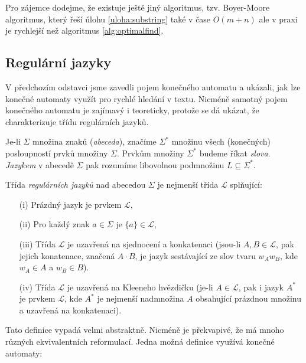 
Pro zájemce dodejme, že existuje ještě jiný algoritmus, tzv. Boyer-Moore algoritmus, 
který řeší úlohu \ref{uloha:substring} také v čase \(O(m+n)\) ale v praxi je rychlejší než 
algoritmus \ref{alg:optimalfind}.

\subsection*{Regulární jazyky}

V předchozím odstavci jsme zavedli pojem konečného automatu a ukázali, jak lze konečné
automaty využít pro rychlé hledání v textu. Nicméně samotný pojem konečného automatu 
je zajímavý i teoreticky, protože se dá ukázat, že charakterizuje třídu regulárních jazyků. 

\begin{definition} Je-li \(\Sigma\) množina znaků (\emph{abeceda}), značíme \(\Sigma^*\) množinu všech
(konečných) posloupností prvků množiny \(\Sigma\). Prvkům množiny \(\Sigma^*\) budeme říkat
\emph{slova}.  \emph{Jazykem} v abecedě \(\Sigma\) pak rozumíme libovolnou podmnožinu \(L\subseteq\Sigma^*\).
\end{definition}

\begin{definition}  Třída \emph{regulárních jazyků} nad abecedou \(\Sigma\) je nejmenší třída \(\mathcal L\) splňující:
\begin{itemize}
  \item[(i)] Prázdný jazyk je prvkem \(\mathcal L\),
 \item[(ii)] Pro každý znak \(a\in\Sigma\) je \(\{a\}\in\mathcal L\),
 \item[(iii)] Třída \(\mathcal L\) je uzavřená na sjednocení a konkatenaci (jsou-li \(A,B\in\mathcal L\), pak jejich konatenace,
                     značená \(A\cdot B\), je jazyk sestávající ze slov tvaru \(w_Aw_B\), kde \(w_A\in A\) a \(w_B\in B\)).
 \item[(iv)] Třída \(\mathcal L\) je uzavřená na Kleeneho hvězdičku (je-li \(A\in\mathcal L\), pak i jazyk \(A^*\) je prvkem
                     \(\mathcal L\), kde \(A^*\) je nejmenší nadmnožina \(A\) obsahující prázdnou množinu a uzavřená na konkatenaci).
\end{itemize}
\end{definition}

Tato definice vypadá velmi abstraktně. Nicméně je překvapivé, že má mnoho různých ekvivalentních reformulací.
Jedna možná definice využívá konečné automaty:

